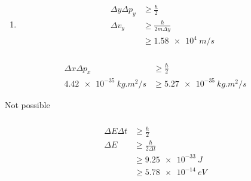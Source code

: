 \documentclass{article}
\begin{document}
\setcounter{subsubsection}{44}
\subsubsection{}

\begin{enumerate}
  \item

        \begin{align*}
          \Delta y \Delta p_y & \ge \frac{\hbar}{2}            \\
          \Delta v_y          & \ge \frac{\hbar}{2 m \Delta y} \\
                              & \ge \qty{1.58e4}{m/s}
        \end{align*}
\end{enumerate}

\setcounter{subsubsection}{46}
\subsubsection{}

\begin{align*}
  \Delta x \Delta p_x      & \ge \frac{\hbar}{2}          \\
  \qty{4.42e-35}{kg.m^2/s} & \ge \qty{5.27e-35}{kg.m^2/s}
\end{align*}

Not possible

\setcounter{subsubsection}{48}
\subsubsection{}

\begin{align*}
  \Delta E \Delta t & \ge \frac{\hbar}{2}          \\
  \Delta E          & \ge \frac{\hbar}{2 \Delta t} \\
                    & \ge \qty{9.25e-33}{J}        \\
                    & \ge \qty{5.78e-14}{eV}
\end{align*}

\setcounter{subsubsection}{50}
\subsubsection{}
\end{document}
